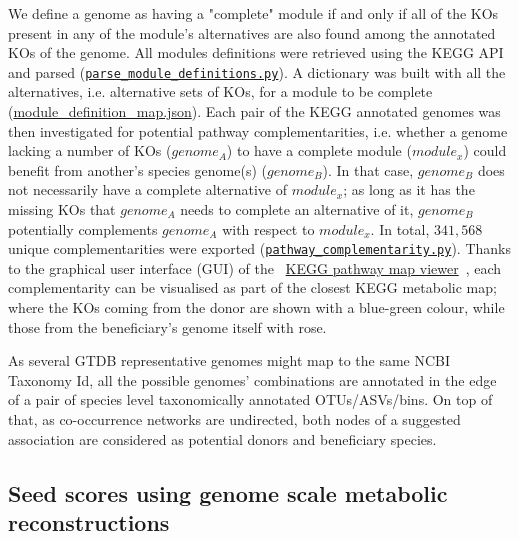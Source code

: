 \documentclass[sn-mathphys,Numbered, lineno]{sn-jnl}  %
\theoremstyle{thmstyleone}%
\theoremstyle{thmstyletwo}%
\theoremstyle{thmstylethree}%
\begin{document}
        We define a genome as having a "complete" module if and only if all of the KOs present in any of the module's alternatives are also found among the annotated KOs of the genome.
        All modules definitions were retrieved using the KEGG API and parsed 
        (\href{https://github.com/hariszaf/microbetag/blob/develop/microbetagDB/mappings/kegg_mappings/parse_module_definitions.py}{\texttt{parse\_module\_definitions.py}}).
        A dictionary was built with all the alternatives, i.e. alternative sets of KOs, for a module to be complete 
        (\href{https://github.com/hariszaf/microbetag/blob/develop/microbetagDB/mappings/kegg_mappings/module_definition_map.json}{module\_definition\_map.json}).
        Each pair of the KEGG annotated genomes was then investigated for potential pathway complementarities, 
        i.e. whether a genome lacking a number of KOs ($genome_A$) to have a complete module ($module_x$) could benefit from another's species genome(s) ($genome_B$).
        In that case, $genome_B$ does not necessarily have a complete alternative of $module_x$; as long as it has the missing KOs that $genome_A$ needs to complete an alternative of it, $genome_B$ potentially complements $genome_A$ with respect to $module_x$.
        In total, $341,568$ unique complementarities were exported (\href{https://github.com/hariszaf/microbetag/blob/develop/microbetagDB/scripts/pathway_complementarity.py}{\texttt{pathway\_complementarity.py}}).
        Thanks to the graphical user interface (GUI) of the ~\href{https://www.kegg.jp/kegg/docs/color_gui.html}{KEGG pathway map viewer}~\cite{kanehisa2020kegg,kanehisa2022kegg}, 
        each complementarity can be visualised as part of the closest KEGG metabolic map; 
        where the KOs coming from the donor are shown with a blue-green colour, while those from the beneficiary's genome itself with rose.

        As several GTDB representative genomes might map to the same NCBI Taxonomy Id, all the possible genomes' combinations are annotated in the edge of a pair of species level taxonomically annotated OTUs/ASVs/bins.
        On top of that, as co-occurrence networks are undirected, both nodes of a suggested association are considered as potential donors and beneficiary species. 
        
        


    \subsection*{ Seed scores using genome scale metabolic reconstructions }
    \label{subsec:seeds}
\end{document}
